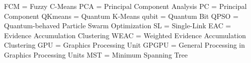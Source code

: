 FCM = Fuzzy C-Means
PCA = Principal Component Analysis
PC = Principal Component
QKmeans = Quantum K-Means
qubit = Quantum Bit
QPSO = Quantum-behaved Particle Swarm Optimization
SL = Single-Link
EAC = Evidence Accumulation Clustering
WEAC = Weighted Evidence Accumulation Clustering
GPU = Graphics Processing Unit
GPGPU = General Processing in Graphics Processing Units
MST = Minimum Spanning Tree
